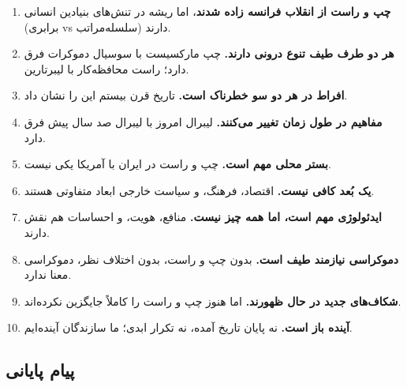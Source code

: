 \begin{tcolorbox}[
    enhanced,
    colback=lightbg,
    colframe=goldaccent,
    boxrule=2pt,
    arc=8pt,
    fonttitle=\bfseries\large,
    title={\rl{🎯 ده درس کلیدی}}
]
\begin{enumerate}
    \item \textbf{چپ و راست از انقلاب فرانسه زاده شدند}، اما ریشه در تنش‌های بنیادین انسانی (برابری vs سلسله‌مراتب) دارند.
    
    \item \textbf{هر دو طرف طیف تنوع درونی دارند.} چپ مارکسیست با سوسیال دموکرات فرق دارد؛ راست محافظه‌کار با لیبرتارین.
    
    \item \textbf{افراط در هر دو سو خطرناک است.} تاریخ قرن بیستم این را نشان داد.
    
    \item \textbf{مفاهیم در طول زمان تغییر می‌کنند.} لیبرال امروز با لیبرال صد سال پیش فرق دارد.
    
    \item \textbf{بستر محلی مهم است.} چپ و راست در ایران با آمریکا یکی نیست.
    
    \item \textbf{یک بُعد کافی نیست.} اقتصاد، فرهنگ، و سیاست خارجی ابعاد متفاوتی هستند.
    
    \item \textbf{ایدئولوژی مهم است، اما همه چیز نیست.} منافع، هویت، و احساسات هم نقش دارند.
    
    \item \textbf{دموکراسی نیازمند طیف است.} بدون چپ و راست، بدون اختلاف نظر، دموکراسی معنا ندارد.
    
    \item \textbf{شکاف‌های جدید در حال ظهورند.} اما هنوز چپ و راست را کاملاً جایگزین نکرده‌اند.
    
    \item \textbf{آینده باز است.} نه پایان تاریخ آمده، نه تکرار ابدی؛ ما سازندگان آینده‌ایم.
\end{enumerate}
\end{tcolorbox}

\vspace{5mm}

\subsection{پیام پایانی}


